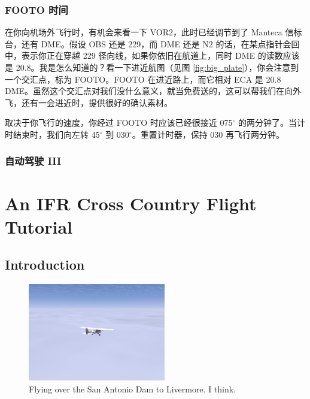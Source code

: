 \subsection{FOOTO 时间}

在你向机场外飞行时，有机会来看一下 VOR2，此时已经调节到了 Manteca 信标台，还有 DME。假设 OBS 还是 229，而 DME 还是 N2 的话，在某点指针会回中，表示你正在穿越 229 径向线，如果你依旧在航道上，同时 DME 的读数应该是 20.8。我是怎么知道的？看一下进近航图（见图 \ref{fig:big_plate}），你会注意到一个交汇点，标为 FOOTO。FOOTO 在进近路上，而它相对 ECA 是 20.8 DME。虽然这个交汇点对我们没什么意义，就当免费送的，这可以帮我们在向外飞，还有一会进近时，提供很好的确认素材。

取决于你飞行的速度，你经过 FOOTO 时应该已经很接近 075$^\circ$ 的两分钟了。当计时结束时，我们向左转 45$^\circ$ 到  030$^\circ$。重置计时器，保持 030 再飞行两分钟。

\subsection{自动驾驶 III}



\fi
\iffalse
\chapter{An IFR Cross Country Flight Tutorial}
\label{IFR Tutorial}

\section{Introduction}

\begin{figure}[h]
  \begin{center}
    \includegraphics[width=6cm]{img/somewhere}
    \caption{Flying over the San Antonio Dam to Livermore.  I think.}
    \label{fig:somewhere}
  \end{center}
\end{figure}

